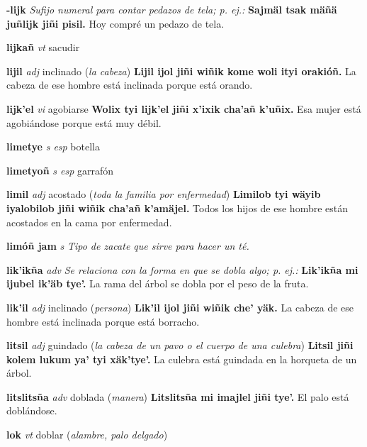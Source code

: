\documentclass[10pt]{scrbook}
\newcommand{\entry}[1]{\textbf{#1}}
\newcommand{\nontranslationdef}[1]{\textit{#1}}
\newcommand{\partofspeech}[1]{\textit{#1}}
\newcommand{\spanishtranslation}[1]{#1}
\newcommand{\clarification}[1]{(\textit{#1})}
\newcommand{\cholexample}[1]{\textbf{#1}}
\newcommand{\exampletranslation}[1]{#1}
\begin{document}
\begin{multicols}{2}
\entry{-lijk}
\nontranslationdef{Sufijo numeral para contar pedazos de tela; p. ej.:}
\cholexample{Sajmäl tsak mäñä juñlijk jiñi pisil.}
\exampletranslation{Hoy compré un pedazo de tela.}

\entry{lijkañ}
\partofspeech{vt}
\spanishtranslation{sacudir}

\entry{lijil}
\partofspeech{adj}
\spanishtranslation{inclinado}
\clarification{la cabeza}
\cholexample{Lijil ijol jiñi wiñik kome woli ityi orakióñ.}
\exampletranslation{La cabeza de ese hombre está inclinada porque está orando.}

\entry{lijk'el}
\partofspeech{vi}
\spanishtranslation{agobiarse}
\cholexample{Wolix tyi lijk'el jiñi x'ixik cha'añ k'uñix.}
\exampletranslation{Esa mujer está agobiándose porque está muy débil.}

\entry{limetye}
\partofspeech{s esp}
\spanishtranslation{botella}

\entry{limetyoñ}
\partofspeech{s esp}
\spanishtranslation{garrafón}

\entry{limil}
\partofspeech{adj}
\spanishtranslation{acostado}
\clarification{toda la familia por enfermedad}
\cholexample{Limilob tyi wäyib iyalobilob jiñi wiñik cha'añ k'amäjel.}
\exampletranslation{Todos los hijos de ese hombre están acostados en la cama por enfermedad.}

\entry{limóñ jam}
\partofspeech{s}
\nontranslationdef{Tipo de zacate que sirve para hacer un té.}

\entry{lik'ikña}
\partofspeech{adv}
\nontranslationdef{Se relaciona con la forma en que se dobla algo; p. ej.:}
\cholexample{Lik'ikña mi ijubel ik'äb tye'.}
\exampletranslation{La rama del árbol se dobla por el peso de la fruta.}

\entry{lik'il}
\partofspeech{adj}
\spanishtranslation{inclinado}
\clarification{persona}
\cholexample{Lik'il ijol jiñi wiñik che' yäk.}
\exampletranslation{La cabeza de ese hombre está inclinada porque está borracho.}

\entry{litsil}
\partofspeech{adj}
\spanishtranslation{guindado}
\clarification{la cabeza de un pavo o el cuerpo de una culebra}
\cholexample{Litsil jiñi kolem lukum ya' tyi xäk'tye'.}
\exampletranslation{La culebra está guindada en la horqueta de un árbol.}

\entry{litslitsña}
\partofspeech{adv}
\spanishtranslation{doblada}
\clarification{manera}
\cholexample{Litslitsña mi imajlel jiñi tye'.}
\exampletranslation{El palo está doblándose.}

\entry{lok}
\partofspeech{vt}
\spanishtranslation{doblar}
\clarification{alambre, palo delgado}


\end{multicols}
\end{document}

